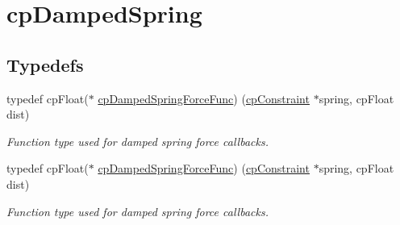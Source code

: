 \hypertarget{group__cpDampedSpring}{}\section{cp\+Damped\+Spring}
\label{group__cpDampedSpring}
\subsection*{Typedefs}
\begin{DoxyCompactItemize}
\item 
\mbox{\label{group__cpDampedSpring_gad88d8466e0057d4ad05183fb14fa274d}} 
typedef cp\+Float($\ast$ \hyperlink{group__cpDampedSpring_gad88d8466e0057d4ad05183fb14fa274d}{cp\+Damped\+Spring\+Force\+Func}) (\hyperlink{structcpConstraint}{cp\+Constraint} $\ast$spring, cp\+Float dist)
\begin{DoxyCompactList}\small\item\em Function type used for damped spring force callbacks. \end{DoxyCompactList}\item 
\mbox{\label{group__cpDampedSpring_gad88d8466e0057d4ad05183fb14fa274d}} 
typedef cp\+Float($\ast$ \hyperlink{group__cpDampedSpring_gad88d8466e0057d4ad05183fb14fa274d}{cp\+Damped\+Spring\+Force\+Func}) (\hyperlink{structcpConstraint}{cp\+Constraint} $\ast$spring, cp\+Float dist)
\begin{DoxyCompactList}\small\item\em Function type used for damped spring force callbacks. \end{DoxyCompactList}\end{DoxyCompactItemize}
